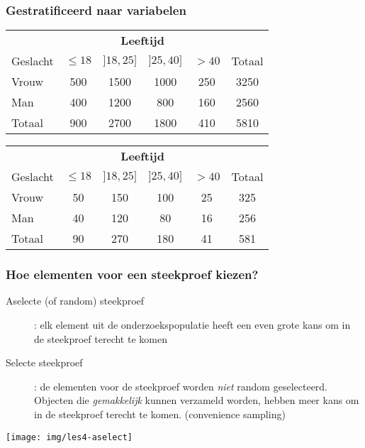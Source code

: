 \documentclass[aspectratio=169]{beamer}
\begin{document}
\begin{frame}
  \frametitle{Gestratificeerd naar variabelen}

  \begin{center}
    \begin{tabular}{l|cccc|c}
      & \multicolumn{4}{c|}{\textbf{Leeftijd}} & \\
      Geslacht & $\le 18$ & $]18,25]$ & $]25, 40]$ & $> 40$ & Totaal\\
      \hline
      Vrouw & 500 & 1500 & 1000 & 250 & 3250 \\
      Man   & 400 & 1200 & 800 & 160 & 2560\\
      \hline
      Totaal & 900 & 2700 & 1800 & 410 & 5810
    \end{tabular}

    \vspace{.5cm}

    \pause
    \begin{tabular}{l|cccc|c}
      & \multicolumn{4}{c|}{\textbf{Leeftijd}} & \\
      Geslacht & $\le 18$ & $]18,25]$ & $]25, 40]$ & $> 40$ & Totaal\\
      \hline
      Vrouw & 50 & 150 & 100 & 25 & 325 \\
      Man   & 40 & 120 & 80 & 16 & 256\\
      \hline
      Totaal & 90 & 270 & 180 & 41 & 581
    \end{tabular}

  \end{center}
\end{frame}

\begin{frame}
  \frametitle{Hoe elementen voor een steekproef kiezen?}

  \begin{description}
    \item[Aselecte (of random) steekproef]: elk element uit de onderzoekspopulatie heeft een even grote kans om in de steekproef terecht te komen
    \item[Selecte steekproef]: de elementen voor de steekproef worden \textit{niet} random geselecteerd.
    Objecten die \textit{gemakkelijk} kunnen verzameld worden, hebben meer kans om in de steekproef terecht te komen.
    (convenience sampling)
  \end{description}

  \begin{center}
    \texttt{[image: img/les4-aselect]}
  \end{center}
\end{frame}
\end{document}
